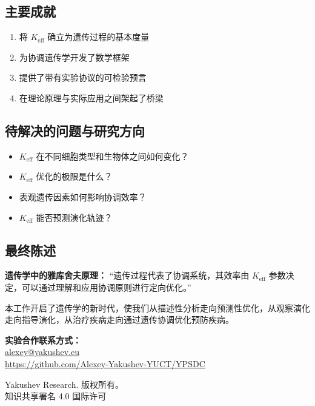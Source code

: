 \documentclass[12pt]{article}
\begin{document}
	\subsection{主要成就}
	
	\begin{enumerate}
		\item 将 $K_{\text{eff}}$ 确立为遗传过程的基本度量
		\item 为协调遗传学开发了数学框架
		\item 提供了带有实验协议的可检验预言
		\item 在理论原理与实际应用之间架起了桥梁
	\end{enumerate}
	
	\subsection{待解决的问题与研究方向}
	
	\begin{itemize}
		\item $K_{\text{eff}}$ 在不同细胞类型和生物体之间如何变化？
		\item $K_{\text{eff}}$ 优化的极限是什么？
		\item 表观遗传因素如何影响协调效率？
		\item $K_{\text{eff}}$ 能否预测演化轨迹？
	\end{itemize}
	
	\subsection{最终陈述}
	
	\textbf{遗传学中的雅库舍夫原理：}
	“遗传过程代表了协调系统，其效率由 $K_{\text{eff}}$ 参数决定，可以通过理解和应用协调原则进行定向优化。”
	
	本工作开启了遗传学的新时代，使我们从描述性分析走向预测性优化，从观察演化走向指导演化，从治疗疾病走向通过遗传协调优化预防疾病。
	
	\begin{center}
		\vspace{1cm}
		\textbf{实验合作联系方式：}\\
		\url{alexey@yakushev.eu}\\
		\url{https://github.com/Alexey-Yakushev-YUCT/YPSDC}
		
		\vspace{0.5cm}
		 Yakushev Research. 版权所有。\\
		知识共享署名 4.0 国际许可
	\end{center}
	
\end{document}
